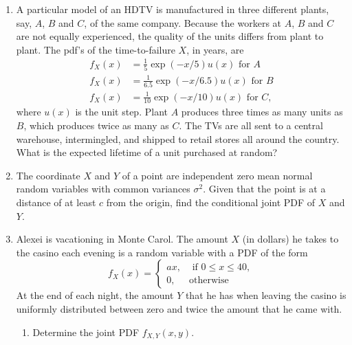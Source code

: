 \documentclass[paper=usletter, fontsize=12pt]{article}
\begin{document}
\begin{enumerate}
        \item A particular model of an HDTV is manufactured in three different
        plants, say, $A$, $B$ and $C$, of the same company. Because the workers
        at $A$, $B$ and $C$ are not equally experienced, the quality of the
        units differs from plant to plant. The pdf's of the time-to-failure
        $X$, in years, are
        \begin{align*}
            f_X(x) &= \frac{1}{5}\exp(-x/5)u(x) \text{ for } A\\
            f_X(x) &= \frac{1}{6.5}\exp(-x/6.5)u(x) \text{ for } B\\
            f_X(x) &= \frac{1}{10}\exp(-x/10)u(x) \text{ for } C,
        \end{align*}
        \endgroup
        where $u(x)$ is the unit step. Plant $A$ produces three times as many
        units as $B$, which produces twice as many as $C$. The TVs are all sent
        to a central warehouse, intermingled, and shipped to retail stores all
        around the country. What is the expected lifetime of a unit purchased
        at random?

        \item The coordinate $X$ and $Y$ of a point are independent zero mean
        normal random variables with common variances $\sigma^2$. Given that
        the point is at a distance of at least $c$ from the origin, find the
        conditional joint PDF of $X$ and $Y$.

        \item Alexei is vacationing in Monte Carol. The amount $X$ (in dollars)
        he takes to the casino each evening is a random variable with a PDF of
        the form
        \begin{equation*}
            f_X(x)=
            \begin{cases}
                ax, & \text{ if } 0 \le x \le 40,\\
                0, & \text{otherwise}
            \end{cases}
        \end{equation*}
        At the end of each night, the amount $Y$ that he has when leaving the
        casino is uniformly distributed between zero and twice the amount that
        he came with.
        \begin{enumerate}

            \item Determine the joint PDF $f_{X,Y}(x,y)$.


\end{enumerate}
\end{enumerate}
\end{document}
